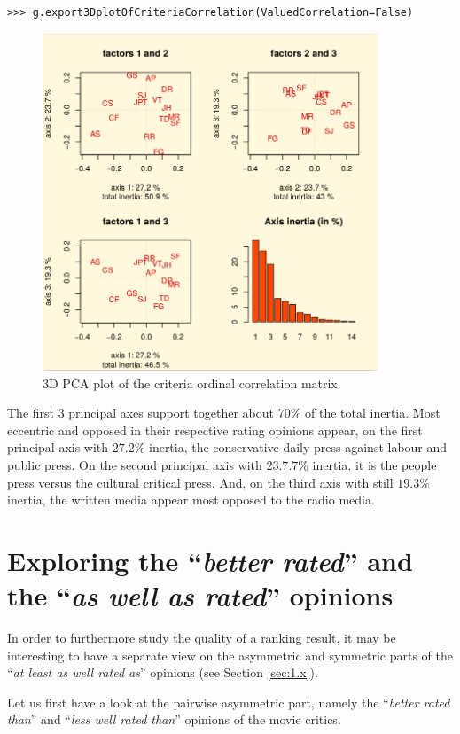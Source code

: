 \begin{lstlisting}
>>> g.export3DplotOfCriteriaCorrelation(ValuedCorrelation=False)
\end{lstlisting}
\begin{figure}[h]
\includegraphics[width=10cm]{Figures/correlationPCA.png}
\caption{3D PCA plot of the criteria ordinal correlation matrix.}
\label{fig:16.7}       %
\end{figure}
The first 3 principal axes support together about $70\%$ of the total inertia. Most eccentric and opposed in their respective rating opinions appear, on the first principal axis with $27.2\%$ inertia, the conservative daily press against labour and public press. On the second principal axis with $23.7.7\%$ inertia, it is the people press versus the cultural critical press. And, on the third axis with still $19.3\%$ inertia, the written media appear most opposed to the radio media.

\section{Exploring the ``\emph{better rated}''  and the ``\emph{as well as rated}'' opinions}
\label{sec:16.5}

In order to furthermore study the quality of a ranking result, it may be interesting to have a separate view on the asymmetric and symmetric parts of the ``\emph{at least as well rated as}'' opinions (see Section \ref{sec:1.x}).

Let us first have a look at the pairwise asymmetric part, namely the ``\emph{better rated than}'' and ``\emph{less well rated than}'' opinions of the movie critics. 

